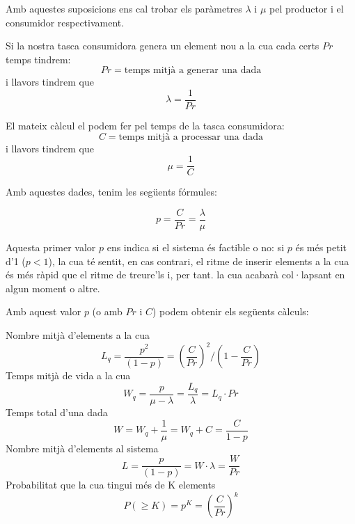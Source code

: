Amb aquestes suposicions ens cal trobar els paràmetres $\lambda$ i $\mu$ pel productor i el consumidor respectivament.

Si la nostra tasca consumidora genera un element nou a la cua cada certs $Pr$ temps tindrem:
\begin{equation}
 Pr = \text {temps mitjà a generar una dada}
\end{equation}
i llavors tindrem que
\begin{equation}
 \lambda = \frac{1}{Pr}
\end{equation}

El mateix càlcul el podem fer pel temps de la tasca consumidora:
\begin{equation}
C = \text {temps mitjà a processar una dada}
\end{equation}
i llavors tindrem que
\begin{equation}
 \mu = \frac{1}{C}
\end{equation}

Amb aquestes dades, tenim les següents fórmules:

\begin{equation}
 p = \frac{C}{Pr} = \frac{\lambda}{\mu}
\end{equation}

Aquesta primer valor $p$ ens indica si el sistema és factible o no: si $p$ és més petit d'1 ($p < 1$), la cua té sentit, en cas contrari, el ritme de inserir elements a la cua és més ràpid que el ritme de treure'ls i, per tant. la cua acabarà col·lapsant en algun moment o altre.

Amb aquest valor $p$ (o amb $Pr$ i $C$) podem obtenir els següents càlculs:

Nombre mitjà d'elements a la cua
\begin{equation}
 L_q = \frac{p^2}{(1-p)}  = (\frac{C}{Pr})^2 / (1 - \frac{C}{Pr})
\end{equation}
Temps mitjà de vida a la cua
\begin{equation}
 W_q =  \frac{p}{\mu - \lambda} = \frac{L_q}{\lambda} = L_q \cdot Pr
\end{equation}
Temps total d'una dada
\begin{equation}
 W = W_q + \frac{1}{\mu} = W_q +C = \frac{C}{1-p}
\end{equation}
Nombre mitjà d'elements al sistema
\begin{equation}
 L = \frac{p}{(1-p)}  = W \cdot \lambda = \frac{W}{Pr}
\end{equation}
Probabilitat que la cua tingui més de K elements
\begin{equation}
\label{eq:Prob_queue_full}
 P(\geqslant K) = p^K =  (\frac{C}{Pr})^k
\end{equation}


